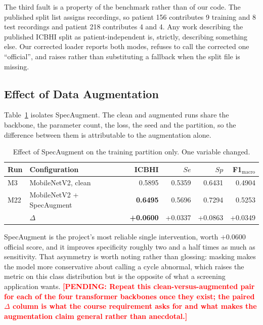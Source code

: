 \documentclass[journal,onecolumn]{IEEEtran}
\newcommand{\pending}[1]{\textcolor{red}{\textbf{[PENDING: #1]}}}
\newcommand{\best}[1]{\textbf{#1}}
\begin{document}
The third fault is a property of the benchmark rather than of our code. The published
split list assigns recordings, so patient 156 contributes 9 training and 8 test
recordings and patient 218 contributes 4 and 4. Any work describing the published
ICBHI split as patient-independent is, strictly, describing something else. Our
corrected loader reports both modes, refuses to call the corrected one ``official'',
and raises rather than substituting a fallback when the split file is missing.

\subsection{Effect of Data Augmentation}
\label{subsec:augmentation}

Table~\ref{tab:augmentation} isolates SpecAugment. The clean and augmented runs share
the backbone, the parameter count, the loss, the seed and the partition, so the
difference between them is attributable to the augmentation alone.

\begin{table}[!t]
\centering
\caption{Effect of SpecAugment on the training partition only. One variable changed.}
\label{tab:augmentation}
\begin{tabular}{llrrrr}
\toprule
Run & Configuration & ICBHI & $Se$ & $Sp$ & F1$_{\text{macro}}$ \\
\midrule
M3  & MobileNetV2, clean        & 0.5895 & 0.5359 & 0.6431 & 0.4904 \\
M22 & MobileNetV2 + SpecAugment & \best{0.6495} & 0.5696 & 0.7294 & 0.5253 \\
\midrule
    & $\Delta$                  & \best{+0.0600} & +0.0337 & +0.0863 & +0.0349 \\
\bottomrule
\end{tabular}
\end{table}

SpecAugment is the project's most reliable single intervention, worth $+0.0600$
official score, and it improves specificity roughly two and a half times as much as
sensitivity. That asymmetry is worth noting rather than glossing: masking makes the
model more conservative about calling a cycle abnormal, which raises the metric on
this class distribution but is the opposite of what a screening application wants.
\pending{Repeat this clean-versus-augmented pair for each of the four transformer
backbones once they exist; the paired $\Delta$ column is what the course requirement
asks for and what makes the augmentation claim general rather than anecdotal.}
\end{document}
